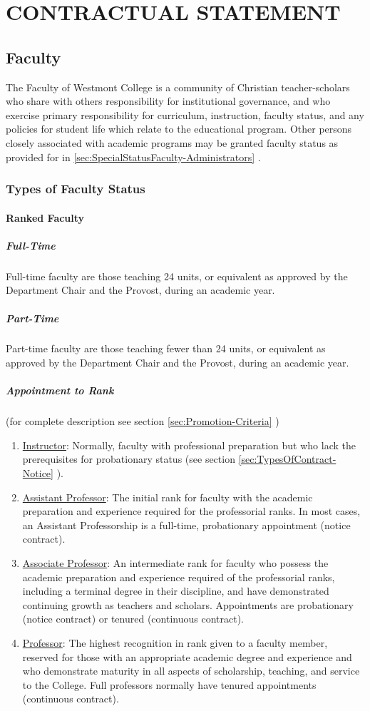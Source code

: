 \section{CONTRACTUAL STATEMENT}
	\label{sec:ContractualStatement}
	\subsection{Faculty}
		The Faculty of Westmont College is a community of Christian teacher-scholars who share with others responsibility for institutional governance, and who exercise primary responsibility for curriculum, instruction, faculty status, and any policies for student life which relate to the educational program.  Other persons closely associated with academic programs may be granted faculty status as provided for in
		\ref{sec:SpecialStatusFaculty-Administrators}
		.
		\subsubsection{Types of Faculty Status}
			\paragraph{Ranked Faculty}
				\label{sec:RankedFaculty}
				\subparagraph{Full-Time}
					Full-time faculty are those teaching 24 units, or equivalent as approved by the Department Chair and the Provost, during an academic year.
				\subparagraph{Part-Time}
					Part-time faculty are those teaching fewer than 24 units, or equivalent as approved by the Department Chair and the Provost, during an academic year.
				\subparagraph{Appointment to Rank}
					\label{sec:AppointmentToRank}
					(for complete description see
					section
					\ref{sec:Promotion-Criteria}
					)
					\begin{enumerate}[label=\alph*)]
						\item{\underline{Instructor}:  Normally, faculty with professional preparation but who lack the prerequisites for probationary status (see
							section
							\ref{sec:TypesOfContract-Notice}
							).}
						\item{\underline{Assistant Professor}:  The initial rank for faculty with the academic preparation and experience required for the professorial ranks. In most cases, an Assistant Professorship is a full-time, probationary appointment (notice contract).}
						\item{\underline{Associate Professor}:  An intermediate rank for faculty who possess the academic preparation and experience required of the professorial ranks, including a terminal degree in their discipline, and have demonstrated continuing growth as teachers and scholars. Appointments are probationary (notice contract) or tenured (continuous contract).}
						\item{\underline{Professor}:  The highest recognition in rank given to a faculty member, reserved for those with an appropriate academic degree and experience and who demonstrate maturity in all aspects of scholarship, teaching, and service to the College. Full professors normally have tenured appointments (continuous contract).}
					\end{enumerate}
